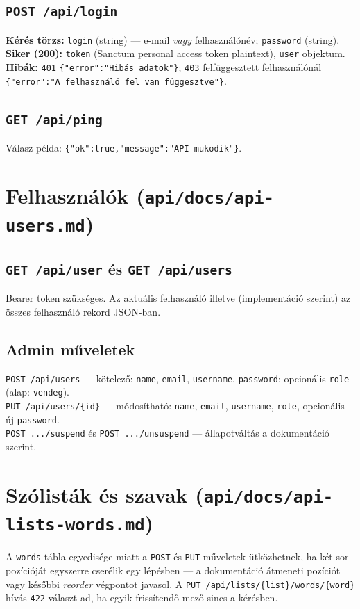 \subsection{\texttt{POST /api/login}}
\textbf{Kérés törzs:} \texttt{login} (string) — e-mail \emph{vagy} felhasználónév; \texttt{password} (string).\\
\textbf{Siker (200):} \texttt{token} (Sanctum personal access token plaintext), \texttt{user} objektum.\\
\textbf{Hibák:} \texttt{401} \texttt{\{"error":"Hibás adatok"\}}; \texttt{403} felfüggesztett felhasználónál \texttt{\{"error":"A felhasználó fel van függesztve"\}}.

\subsection{\texttt{GET /api/ping}}
Válasz példa: \texttt{\{"ok":true,"message":"API mukodik"\}}.

\section{Felhasználók (\texttt{api/docs/api-users.md})}
\subsection{\texttt{GET /api/user} és \texttt{GET /api/users}}
Bearer token szükséges. Az aktuális felhasználó illetve (implementáció szerint) az összes felhasználó rekord JSON-ban.

\subsection{Admin műveletek}
\texttt{POST /api/users} — kötelező: \texttt{name}, \texttt{email}, \texttt{username}, \texttt{password}; opcionális \texttt{role} (alap: \texttt{vendeg}).\\
\texttt{PUT /api/users/\{id\}} — módosítható: \texttt{name}, \texttt{email}, \texttt{username}, \texttt{role}, opcionális új \texttt{password}.\\
\texttt{POST .../suspend} és \texttt{POST .../unsuspend} — állapotváltás a dokumentáció szerint.

\section{Szólisták és szavak (\texttt{api/docs/api-lists-words.md})}
A \texttt{words} tábla egyedisége miatt a \texttt{POST} és \texttt{PUT} műveletek ütközhetnek, ha két sor pozícióját egyszerre cserélik egy lépésben — a dokumentáció átmeneti pozíciót vagy későbbi \emph{reorder} végpontot javasol. A \texttt{PUT /api/lists/\{list\}/words/\{word\}} hívás \texttt{422} választ ad, ha egyik frissítendő mező sincs a kérésben.

